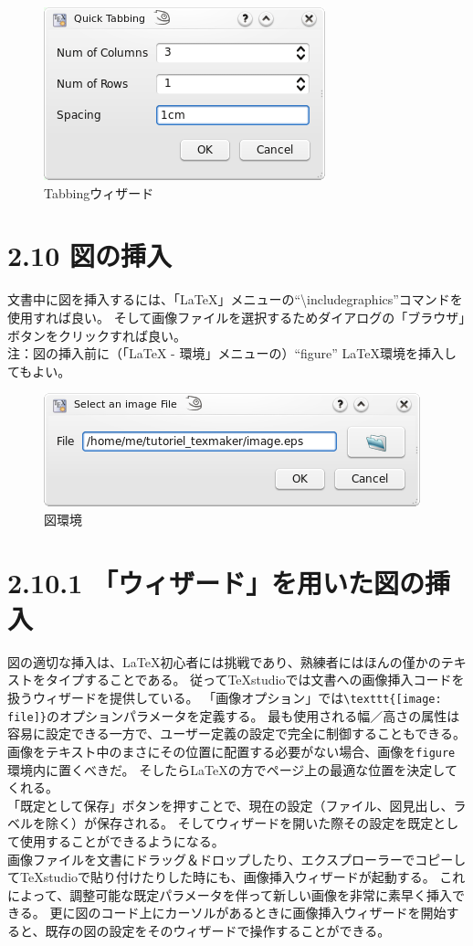 \documentclass[]{book}
\makeatletter
\def\maxwidth{\ifdim\Gin@nat@width>\linewidth\linewidth
\else\Gin@nat@width\fi}
\let\Oldincludegraphics\includegraphics
\renewcommand{\includegraphics}[1]{\Oldincludegraphics[width=\maxwidth]{#1}}
\makeatother
\begin{document}
\begin{figure}[htbp]
\centering
\includegraphics{doc8.png}
\caption{Tabbingウィザード}
\end{figure}

\section{2.10 図の挿入}

文書中に図を挿入するには、「LaTeX」メニューの``\textbackslash{}includegraphics''コマンドを使用すれば良い。
そして画像ファイルを選択するためダイアログの「ブラウザ」ボタンをクリックすれば良い。\\
注：図の挿入前に（「LaTeX - 環境」メニューの）``figure''
LaTeX環境を挿入してもよい。

\begin{figure}[htbp]
\centering
\includegraphics{doc9.png}
\caption{図環境}
\end{figure}

\section{2.10.1 「ウィザード」を用いた図の挿入}

図の適切な挿入は、LaTeX初心者には挑戦であり、熟練者にはほんの僅かのテキストをタイプすることである。
従ってTeXstudioでは文書への画像挿入コードを扱うウィザードを提供している。
「画像オプション」では\lstinline!\texttt{[image: file]}!のオプションパラメータを定義する。
最も使用される幅／高さの属性は容易に設定できる一方で、ユーザー定義の設定で完全に制御することもできる。\\
画像をテキスト中のまさにその位置に配置する必要がない場合、画像を\lstinline!figure!環境内に置くべきだ。
そしたらLaTeXの方でページ上の最適な位置を決定してくれる。\\
「既定として保存」ボタンを押すことで、現在の設定（ファイル、図見出し、ラベルを除く）が保存される。
そしてウィザードを開いた際その設定を既定として使用することができるようになる。\\
画像ファイルを文書にドラッグ＆ドロップしたり、エクスプローラーでコピーしてTeXstudioで貼り付けたりした時にも、画像挿入ウィザードが起動する。
これによって、調整可能な既定パラメータを伴って新しい画像を非常に素早く挿入できる。
更に図のコード上にカーソルがあるときに画像挿入ウィザードを開始すると、既存の図の設定をそのウィザードで操作することができる。
\end{document}
